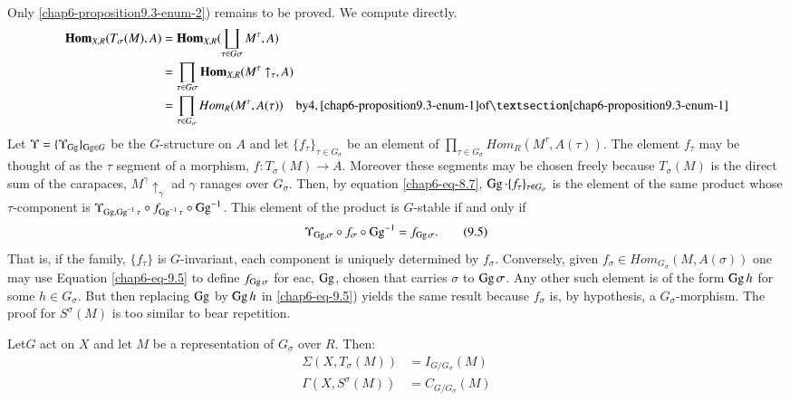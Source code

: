 Only \ref{chap6-proposition9.3-enum-2}) remains to be proved. We compute directly.
\begin{align*}
\bHom_{X, R}(T_{\sigma}(M), A) &= \bHom_{X, R}(\coprod_{\tau \in G{\sigma}} M^{\tau}, A)\\
& = \prod_{\tau \in G\sigma}\bHom_{X, R}(M^{\tau} \uparrow_{\tau}, A)\\
& = \prod_{\tau \in G_{\sigma}} Hom_{R}(M^{\tau}, A(\tau)) \quad \text{by} 4, \eqref{chap6-proposition9.3-enum-1} \text{of} \textsection \ref{chap6-proposition9.3-enum-1}
\end{align*}
Let $\Upsilon = \{\Upsilon_{\operatorname{Gg}}\}_{\operatorname{Gg} \in G}$ be the $G$-structure on $A$ and let $\{f_{\tau}\}_{\tau \in G_{\sigma}}$
be an element of $\prod_{\tau \in G_{\sigma}}Hom_{R}(M^{\tau}, A(\tau))$. The element $f_{\tau}$ may be thought of as the $\tau$ segment of a morphism, $f: T_{\sigma}(M)\rightarrow A$. Moreover these segments may be chosen freely because $T_{\sigma}(M)$ is the direct sum of the carapaces, $M^{\gamma}\uparrow_{\gamma}$ ad $\gamma$ ranages over $G_{\sigma}$. Then, by equation \ref{chap6-eq-8.7}, $\operatorname{Gg} \cdot\{f_{\tau}\}_{\tau\in G_{\sigma}}$ is the element of the same product whose $\tau$-component is $\Upsilon_{\operatorname{Gg}, \operatorname{Gg}^{-1}\tau} \circ f_{\operatorname{Gg}^{-1}\tau} \circ \operatorname{Gg}^{-1}$. This element of the product is $G$-stable if and only if
\begin{equation*}\label{chap6-eq-9.5}
\Upsilon_{\operatorname{Gg}, \sigma} \circ f_{\sigma} \circ \operatorname{Gg}^{-1} = f_{\operatorname{Gg} \sigma}.\tag{9.5}
\end{equation*}
That is, if the family, $\{f_{\tau}\}$ is $G$-invariant, each component is uniquely determined by $f_{\sigma}$. Conversely, given $f_{\sigma} \in  Hom_{G_{\sigma}}(M , A(\sigma))$ one may use Equation \ref{chap6-eq-9.5} to define $f_{\operatorname{Gg} \sigma}$ for eac, $\operatorname{Gg}$, chosen that carries $\sigma$ to $\operatorname{Gg}\sigma$. Any other such element is of the form $\operatorname{Gg} h$ for some $h \in G_{\sigma}$. But then replacing $\operatorname{Gg}$ by $\operatorname{Gg} h$ in \ref{chap6-eq-9.5}) yields the same result because $f_{\sigma}$ is, by hypothesis, a $G_{\sigma}$-morphism. The proof for $S^{\sigma}(M)$ is too similar to bear repetition.

\setcounter{definition}{5}
\begin{secprop}\label{chap6-prop-9.6}
Let\pageoriginale $G$ act on $X$ and let $M$ be a representation of $G_{\sigma}$ over $R$. Then:
\begin{align*}
\Sigma(X, T_{\sigma}(M)) &= I_{G/G_{\sigma}}(M)\\
\Gamma(X, S^{\sigma}(M)) &= C_{G/G_{\sigma}}(M)
\end{align*}
\end{secprop}

